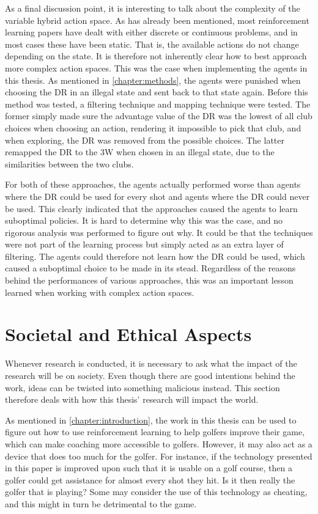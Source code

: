 \documentclass{kththesis}
\begin{document}
As a final discussion point, it is interesting to talk about the complexity of the variable hybrid action space. As has already been mentioned, most reinforcement learning papers have dealt with either discrete or continuous problems, and in most cases these have been static. That is, the available actions do not change depending on the state. It is therefore not inherently clear how to best approach more complex action spaces. This was the case when implementing the agents in this thesis. As mentioned in \autoref{chapter:methods}, the agents were punished when choosing the DR in an illegal state and sent back to that state again. Before this method was tested, a filtering technique and mapping technique were tested. The former simply made sure the advantage value of the DR was the lowest of all club choices when choosing an action, rendering it impossible to pick that club, and when exploring, the DR was removed from the possible choices. The latter remapped the DR to the 3W when chosen in an illegal state, due to the similarities between the two clubs. 

For both of these approaches, the agents actually performed worse than agents where the DR could be used for every shot and agents where the DR could never be used. This clearly indicated that the approaches caused the agents to learn suboptimal policies. It is hard to determine why this was the case, and no rigorous analysis was performed to figure out why. It could be that the techniques were not part of the learning process but simply acted as an extra layer of filtering. The agents could therefore not learn how the DR could be used, which caused a suboptimal choice to be made in its stead. Regardless of the reasons behind the performances of various approaches, this was an important lesson learned when working with complex action spaces.

\section{Societal and Ethical Aspects}
\label{sec:ethics}
Whenever research is conducted, it is necessary to ask what the impact of the research will be on society. Even though there are good intentions behind the work, ideas can be twisted into something malicious instead. This section therefore deals with how this thesis' research will impact the world.

As mentioned in \autoref{chapter:introduction}, the work in this thesis can be used to figure out how to use reinforcement learning to help golfers improve their game, which can make coaching more accessible to golfers. However, it may also act as a device that does too much for the golfer. For instance, if the technology presented in this paper is improved upon such that it is usable on a golf course, then a golfer could get assistance for almost every shot they hit. Is it then really the golfer that is playing? Some may consider the use of this technology as cheating, and this might in turn be detrimental to the game.
\end{document}
